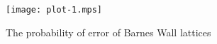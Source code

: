\documentclass{article}
\begin{document}
\begin{figure}[tbp]
	\centering
		\texttt{[image: plot-1.mps]}
		\label{plot:barneswallpe}
		\caption{The probability of error of Barnes Wall lattices}
\end{figure} 
\end{document}
